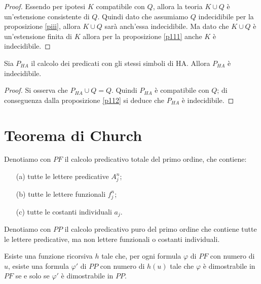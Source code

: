 \begin{proof}
Essendo per ipotesi $K$ compatibile con $Q$, allora la teoria $K \cup Q$ è un'estensione consistente di $Q$.
Quindi dato che assumiamo $Q$ indecidibile per la proposizione \ref{piii},
 allora $K \cup Q$ sarà anch'essa indecidibile.
Ma dato che $K \cup Q$ è un'estensione finita di $K$ allora per la proposizione \ref{p111}
anche $K$ è indecidibile.

\end{proof}

\begin{prop}
\label{p113}
Sia $P_{HA}$ il calcolo dei predicati con gli stessi simboli di HA. Allora $P_{HA}$ è indecidibile.
\end{prop}

\begin{proof}
Si osserva che $P_{HA} \cup Q = Q$. Quindi $P_{HA}$ è compatibile con $Q$; di conseguenza dalla proposizione \ref{p112}
si deduce che $P_{HA}$ è indecidibile.

\end{proof}

\section{Teorema di Church}

\begin{defi}
Denotiamo con $PF$ il calcolo predicativo totale del primo ordine, che contiene:
\begin{itemize}
 \item [(a)] tutte le lettere predicative $A^n_j$;
 \item [(b)] tutte le lettere funzionali $f^n_j$;
 \item [(c)] tutte le costanti individuali $a_j$.
\end{itemize}
\end{defi}

\begin{defi}
 Denotiamo con $PP$ il calcolo predicativo puro del primo ordine che contiene tutte le lettere
predicative, ma non lettere funzionali o costanti individuali.
\end{defi}

\begin{lem}
\label{lmmm}
Esiste una funzione ricorsiva $h$ tale che, per ogni formula $\varphi$ di $PF$ con numero di \godel
$u$, esiste una formula $\varphi'$ di $PP$ con numero di \godel $h(u)$ tale che $\varphi$ è dimostrabile
in $PF$ se e solo se  $\varphi'$ è dimostrabile in $PP$.
\end{lem}

